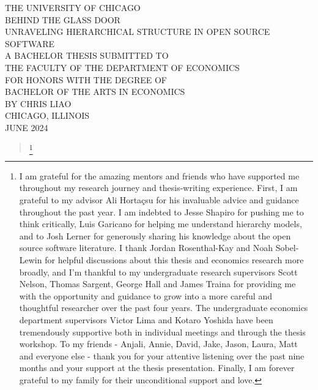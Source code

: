 \documentclass[12pt,notitlepage]{article}
\begin{document}
	\begin{titlepage}
\begin{center}
THE UNIVERSITY OF CHICAGO
\\[1.5in]
BEHIND THE GLASS DOOR\\
UNRAVELING HIERARCHICAL STRUCTURE IN OPEN SOURCE SOFTWARE
\\[1in]
A BACHELOR THESIS SUBMITTED TO \\
\bigskip
THE FACULTY OF THE DEPARTMENT OF ECONOMICS \\
\bigskip
FOR HONORS WITH THE DEGREE OF \\
\bigskip
BACHELOR OF THE ARTS IN ECONOMICS
\\[1.5in]
BY CHRIS LIAO
\\[2in]
CHICAGO, ILLINOIS \\
JUNE 2024
\end{center}
\end{titlepage}

\tableofcontents
\newpage

\begin{abstract}
   \footnote{I am grateful for the amazing mentors and friends who have supported me throughout my research journey and thesis-writing experience. First, I am grateful to my advisor Ali Hortaçsu for his invaluable advice and guidance throughout the past year. I am indebted to Jesse Shapiro for pushing me to think critically, Luis Garicano for helping me understand hierarchy models, and to Josh Lerner for generously sharing his knowledge about the open source software literature. I thank Jordan Rosenthal-Kay and Noah Sobel-Lewin for helpful discussions about this thesis and economics research more broadly, and I'm thankful to my undergraduate research supervisors Scott Nelson, Thomas Sargent, George Hall and James Traina for providing me with the opportunity and guidance to grow into a more careful and thoughtful researcher over the past four years. The undergraduate economics department supervisors Victor Lima and Kotaro Yoshida have been tremendously supportive both in individual meetings and through the thesis workshop. To my friends - Anjali, Annie, David, Jake, Jason, Laura, Matt and everyone else - thank you for your attentive listening over the past nine months and your support at the thesis presentation. Finally, I am forever grateful to my family for their unconditional support and love.
   }
\end{abstract}
\newpage
\end{document}
